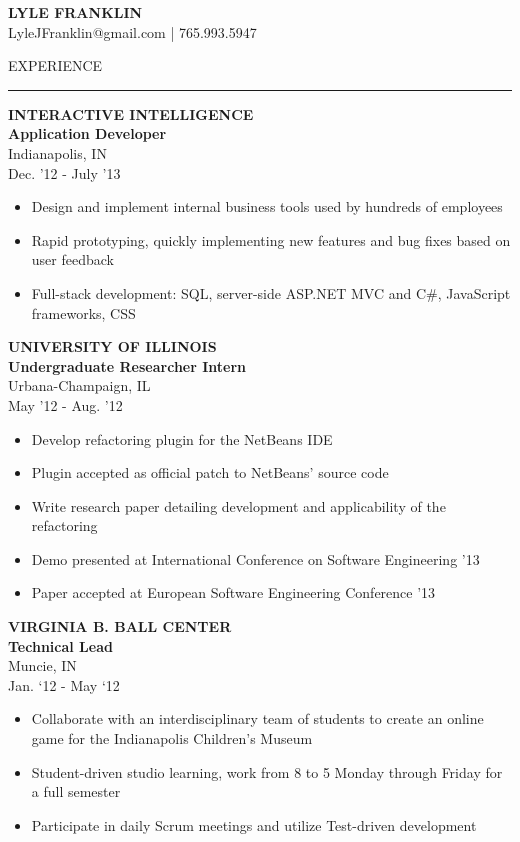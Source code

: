 \documentclass[a4paper,10pt]{article}
\newcommand{\name}[1]{\textbf{\huge{#1}}}
\newcommand{\header}[1]
{
{\Large{\uppercase{#1}}}
\vspace{0.05in}
\hrule
\vspace{0.15in}
}
\newenvironment{details}
{\begin{itemize}[label=\scalebox{.5}{\ding{117}},leftmargin=0.15in]}
{\end{itemize}}
\begin{document}
\name{LYLE FRANKLIN}\\
\indent
LyleJFranklin@gmail.com | 765.993.5947

\vspace{0.2in}

\begin{minipage}[t]{0.5\textwidth}
\header{Experience}

\textbf{INTERACTIVE INTELLIGENCE\\Application Developer}\\
Indianapolis, IN\\
Dec. '12 - July '13

\begin{details}
  \item Design and implement internal business tools used by hundreds of employees
  \item Rapid prototyping, quickly implementing new features and bug fixes based on user feedback
  \item Full-stack development: SQL, server-side ASP.NET MVC and C\#, JavaScript frameworks, CSS
\end{details}


\textbf{UNIVERSITY OF ILLINOIS\\Undergraduate Researcher Intern}\\
Urbana-Champaign, IL\\
May '12 - Aug. '12

\begin{details}
  \item Develop refactoring plugin for the NetBeans IDE
  \item Plugin accepted as official patch to NetBeans’ source code
  \item Write research paper detailing development and applicability of the refactoring
  \item Demo presented at International Conference on Software Engineering '13
  \item Paper accepted at European Software Engineering Conference '13
\end{details}

\textbf{VIRGINIA B. BALL CENTER\\Technical Lead}\\
Muncie, IN\\
Jan. ‘12 - May ‘12

\begin{details}
  \item Collaborate with an interdisciplinary team of students to create
an online game for the Indianapolis Children’s Museum
  \item Student-driven studio learning, work from 8 to 5 Monday
through Friday for a full semester
  \item Participate in daily Scrum meetings and utilize Test-driven
development
\end{details}


\end{minipage}
\end{document}
